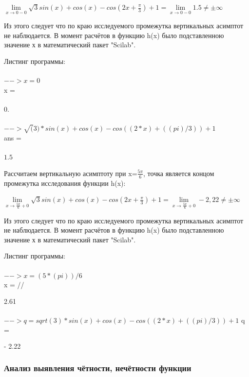 \documentclass[russian,utf8,nocolumnxxxi,nocolumnxxxii]{eskdtext}
\begin{document}
\begin{center}

$\lim\limits_{x\to{0-0}}\sqrt{3}sin(x)+cos(x)-cos(2x+\frac{\pi}{3})+1=\lim\limits_{x\to{0-0}}1.5\neq\pm\infty$

\end{center}

Из этого следует что по краю исследуемого промежутка вертикальных асимптот не наблюдается.
В момент расчётов в функцию h(x) было подставленною значение х в математический пакет "Scilab".

Листинг программы:
\\
\\$-->x=0$
\\ x  =
\\

\\$0.$
\\
\\$-->\sqrt(3)*sin(x)+cos(x)-cos((2*x) + ((pi)/3))+1$
\\ ans  =
\\

\\$1.5$

Рассчитаем вертикальную асимптоту при x=$\frac{5\pi}{6}$, точка является концом промежутка исследования функции h(x):

\begin{center}

$\lim\limits_{x\to{\frac{5\pi}{6}+0}}\sqrt{3}sin(x)+cos(x)-cos(2x+\frac{\pi}{3})+1=\lim\limits_{x\to{\frac{5\pi}{6}+0}}-2,22\neq\pm\infty$

\end{center}

Из этого следует что по краю исследуемого промежутка вертикальных асимптот не наблюдается.
В момент расчётов в функцию h(x) было подставленною значение х в математический пакет "Scilab".

Листинг программы:
\\
\\$-->x=(5*(pi))/6$
\\ x  =
//

 2.61
\\
\\$-->q=sqrt(3)*sin(x)+cos(x)-cos((2*x) + ((pi)/3))+1$
q  =

- 2.22

\subsubsection{Анализ выявления чётности, нечётности функции}
\end{document}
